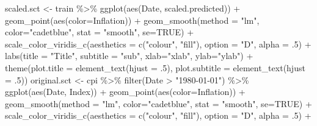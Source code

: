 \documentclass[
]{article}
\newenvironment{Shaded}{\begin{snugshade}}{\end{snugshade}}
\newcommand{\AttributeTok}[1]{\textcolor[rgb]{0.77,0.63,0.00}{#1}}
\newcommand{\ConstantTok}[1]{\textcolor[rgb]{0.00,0.00,0.00}{#1}}
\newcommand{\DecValTok}[1]{\textcolor[rgb]{0.00,0.00,0.81}{#1}}
\newcommand{\FunctionTok}[1]{\textcolor[rgb]{0.00,0.00,0.00}{#1}}
\newcommand{\NormalTok}[1]{#1}
\newcommand{\OtherTok}[1]{\textcolor[rgb]{0.56,0.35,0.01}{#1}}
\newcommand{\SpecialCharTok}[1]{\textcolor[rgb]{0.00,0.00,0.00}{#1}}
\newcommand{\StringTok}[1]{\textcolor[rgb]{0.31,0.60,0.02}{#1}}
\begin{document}
\begin{Shaded}
\begin{Highlighting}[]
\NormalTok{scaled.sct }\OtherTok{\textless{}{-}}\NormalTok{ train }\SpecialCharTok{\%\textgreater{}\%} 
  \FunctionTok{ggplot}\NormalTok{(}\FunctionTok{aes}\NormalTok{(Date, scaled.predicted)) }\SpecialCharTok{+} \FunctionTok{geom\_point}\NormalTok{(}\FunctionTok{aes}\NormalTok{(}\AttributeTok{color=}\NormalTok{Inflation)) }\SpecialCharTok{+} 
  \FunctionTok{geom\_smooth}\NormalTok{(}\AttributeTok{method =} \StringTok{"lm"}\NormalTok{, }\AttributeTok{color=}\StringTok{"cadetblue"}\NormalTok{, }\AttributeTok{stat =} \StringTok{"smooth"}\NormalTok{, }\AttributeTok{se=}\ConstantTok{TRUE}\NormalTok{) }\SpecialCharTok{+}
  \FunctionTok{scale\_color\_viridis\_c}\NormalTok{(}\AttributeTok{aesthetics =} \FunctionTok{c}\NormalTok{(}\StringTok{"colour"}\NormalTok{, }\StringTok{"fill"}\NormalTok{), }\AttributeTok{option =} \StringTok{"D"}\NormalTok{, }\AttributeTok{alpha =}\NormalTok{ .}\DecValTok{5}\NormalTok{) }\SpecialCharTok{+} 
  \FunctionTok{labs}\NormalTok{(}\AttributeTok{title =} \StringTok{"Title"}\NormalTok{, }\AttributeTok{subtitle =} \StringTok{"sub"}\NormalTok{, }\AttributeTok{xlab=}\StringTok{"xlab"}\NormalTok{, }\AttributeTok{ylab=}\StringTok{"ylab"}\NormalTok{) }\SpecialCharTok{+} 
  \FunctionTok{theme}\NormalTok{(}\AttributeTok{plot.title =} \FunctionTok{element\_text}\NormalTok{(}\AttributeTok{hjust =}\NormalTok{ .}\DecValTok{5}\NormalTok{), }\AttributeTok{plot.subtitle =} \FunctionTok{element\_text}\NormalTok{(}\AttributeTok{hjust =}\NormalTok{ .}\DecValTok{5}\NormalTok{))}
\NormalTok{original.sct }\OtherTok{\textless{}{-}}\NormalTok{ cpi }\SpecialCharTok{\%\textgreater{}\%} 
  \FunctionTok{filter}\NormalTok{(Date }\SpecialCharTok{\textgreater{}} \StringTok{"1980{-}01{-}01"}\NormalTok{) }\SpecialCharTok{\%\textgreater{}\%} 
  \FunctionTok{ggplot}\NormalTok{(}\FunctionTok{aes}\NormalTok{(Date, Index)) }\SpecialCharTok{+} \FunctionTok{geom\_point}\NormalTok{(}\FunctionTok{aes}\NormalTok{(}\AttributeTok{color=}\NormalTok{Inflation)) }\SpecialCharTok{+} 
  \FunctionTok{geom\_smooth}\NormalTok{(}\AttributeTok{method =} \StringTok{"lm"}\NormalTok{, }\AttributeTok{color=}\StringTok{"cadetblue"}\NormalTok{, }\AttributeTok{stat =} \StringTok{"smooth"}\NormalTok{, }\AttributeTok{se=}\ConstantTok{TRUE}\NormalTok{) }\SpecialCharTok{+}
  \FunctionTok{scale\_color\_viridis\_c}\NormalTok{(}\AttributeTok{aesthetics =} \FunctionTok{c}\NormalTok{(}\StringTok{"colour"}\NormalTok{, }\StringTok{"fill"}\NormalTok{), }\AttributeTok{option =} \StringTok{"D"}\NormalTok{, }\AttributeTok{alpha =}\NormalTok{ .}\DecValTok{5}\NormalTok{) }\SpecialCharTok{+} 

\end{Highlighting}
\end{Shaded}
\end{document}
